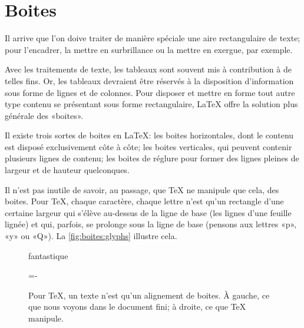 
\chapter{Boites}
\label{chap:boites}

Il arrive que l'on doive traiter de manière spéciale une aire
rectangulaire de texte; pour l'encadrer, la mettre en surbrillance ou
la mettre en exergue, par exemple.

Avec les traitements de texte, les tableaux sont souvent mis à
contribution à de telles fins. Or, les tableaux devraient être
réservés à la disposition d'information sous forme de lignes et de
colonnes. Pour disposer et mettre en forme tout autre type contenu se
présentant sous forme rectangulaire, {\LaTeX} offre la solution plus
générale des «boites».

Il existe trois sortes de boites en {\LaTeX}: les boites horizontales,
dont le contenu est disposé exclusivement côte à côte; les boites
verticales, qui peuvent contenir plusieurs lignes de contenu; les
boites de réglure pour former des lignes pleines de largeur et de
hauteur quelconques.

Il n'est pas inutile de savoir, au passage, que {\TeX} ne manipule que
cela, des boites. Pour {\TeX}, chaque caractère, chaque lettre n'est
qu'un rectangle d'une certaine largeur qui s'élève au-dessus de la
ligne de base (les lignes d'une feuille lignée) et qui, parfois, se
prolonge sous la ligne de base (pensons aux lettres «p», «y»
ou «Q»). La \autoref{fig:boites:glyphs} illustre cela.

\begin{figure}[t]
  \begin{minipage}{0.45\linewidth}
    \centering\huge
    fantastique
  \end{minipage}
  \hfill
  \begin{minipage}{0.45\linewidth}
    \fboxrule=0.1pt
    \fboxsep=-\fboxrule
    \makeatletter
    \def\SOUL@soeverytoken{%
      \fbox{\color{white}\the\SOUL@token}}
    \makeatother
    \centering
  \end{minipage}
  \caption[Pour {\TeX}, un texte n'est qu'un alignement de boites]{%
    Pour {\TeX}, un texte n'est qu'un alignement de boites. À gauche,
    ce que nous voyons dans le document fini; à droite, ce que {\TeX}
    manipule.}
  \label{fig:boites:glyphs}
\end{figure}

